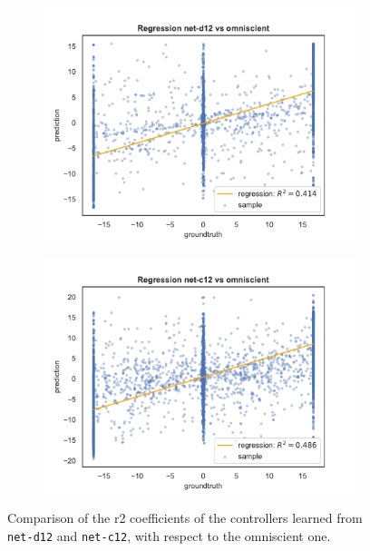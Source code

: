 \begin{figure}[!htb]
	\begin{center}
		\begin{subfigure}[h]{0.49\textwidth}
			\includegraphics[width=\textwidth]{contents/images/net-d12/regression-net-d12-vs-omniscient}%
		\end{subfigure}
		\hfill\vspace{-0.5cm}
		\begin{subfigure}[h]{0.49\textwidth}
			\includegraphics[width=\textwidth]{contents/images/net-c12/regression-net-c12-vs-omniscient}%
		\end{subfigure}
	\end{center}
	\caption[Evaluation of the \gls{r2} coefficients of \texttt{net-c12}.]{Comparison 
		of the \gls{r2} coefficients of the controllers learned from 
		\texttt{net-d12} and \texttt{net-c12}, with respect to the omniscient one.}
	\label{fig:net-c12r2}
\end{figure}


